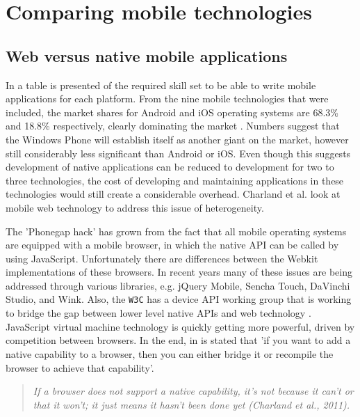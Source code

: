 \chapter{Comparing mobile technologies}\label{chapter:comparison}


\section{Web versus native mobile applications}

In \cite{Charland:2011:MAD:1941487.1941504} a table is presented of the required skill set to be able to write mobile applications for each platform. From the nine mobile technologies that were included, the market shares for Android and iOS operating systems are 68.3\% and 18.8\% respectively, clearly dominating the market \cite{Graziano:2012}. Numbers suggest that the Windows Phone will establish itself as another giant on the market, however still considerably less significant than Android or iOS. Even though this suggests development of native applications can be reduced to development for two to three technologies, the cost of developing and maintaining applications in these technologies would still create a considerable overhead. Charland et al. \cite{Charland:2011:MAD:1941487.1941504} look at mobile web technology to address this issue of heterogeneity.

The 'Phonegap hack' has grown from the fact that all mobile operating systems are equipped with a mobile browser, in which the native API can be called by using JavaScript. Unfortunately there are differences between the Webkit implementations of these browsers. In recent years many of these issues are being addressed through various libraries, e.g. jQuery Mobile, Sencha Touch, DaVinchi Studio, and Wink\cite{Charland:2011:MAD:1941487.1941504, mobpartner:2013}. Also, the \texttt{W3C} has a device API working group that is working to bridge the gap between lower level native APIs and web technology \cite{Charland:2011:MAD:1941487.1941504}. JavaScript virtual machine technology is quickly getting more powerful, driven by competition between browsers. In the end, in \cite{Charland:2011:MAD:1941487.1941504} is stated that 'if you want to add a native capability to a browser, then you can either bridge it or recompile the browser to achieve that capability'.

\begin{quotation}
	\textit{If a browser does not support a native capability, it's not because it can't or that it won't; it just means it hasn't been done yet (Charland et al., 2011).}
\end{quotation}

